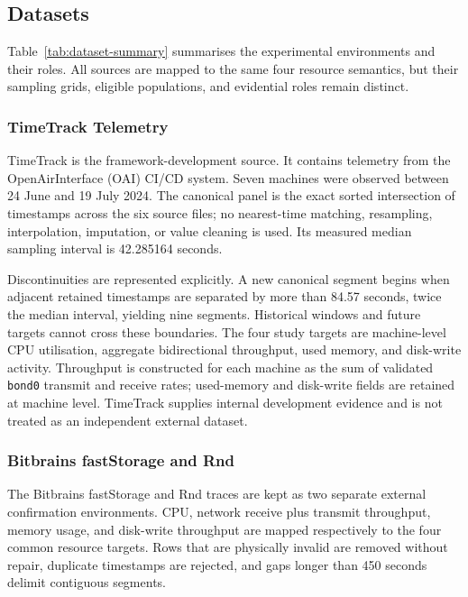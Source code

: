 \documentclass[5p,twocolumn]{elsarticle}
\begin{document}
\subsection{Datasets}
\label{sec:datasets}

Table~\ref{tab:dataset-summary} summarises the experimental environments and
their roles.  All sources are mapped to the same four resource semantics, but
their sampling grids, eligible populations, and evidential roles remain
distinct.

\subsubsection{TimeTrack Telemetry}
\label{sec:timetrack-data}

TimeTrack is the framework-development source.  It contains telemetry from the
OpenAirInterface (OAI) CI/CD system.  Seven machines were observed between
24 June and 19 July 2024.  The canonical panel
is the exact sorted intersection of timestamps across the six source files; no
nearest-time matching, resampling, interpolation, imputation, or value cleaning
is used.  Its measured median sampling interval is 42.285164 seconds.

Discontinuities are represented explicitly.  A new canonical segment begins
when adjacent retained timestamps are separated by more than 84.57 seconds,
twice the median interval, yielding nine segments.  Historical windows and
future targets cannot cross these boundaries.  The four study targets are
machine-level CPU utilisation, aggregate bidirectional throughput, used memory,
and disk-write activity.  Throughput is constructed for each machine as the sum
of validated \texttt{bond0} transmit and receive rates; used-memory and
disk-write fields are retained at machine level.  TimeTrack supplies internal
development evidence and is not treated as an independent external dataset.

\subsubsection{Bitbrains fastStorage and Rnd}
\label{sec:bitbrains-data}

The Bitbrains fastStorage and Rnd traces are kept as two separate external
confirmation environments.  CPU,
network receive plus transmit throughput, memory usage, and disk-write
throughput are mapped respectively to the four common resource targets.  Rows
that are physically invalid are removed without repair, duplicate timestamps
are rejected, and gaps longer than 450 seconds delimit contiguous segments.
\end{document}
